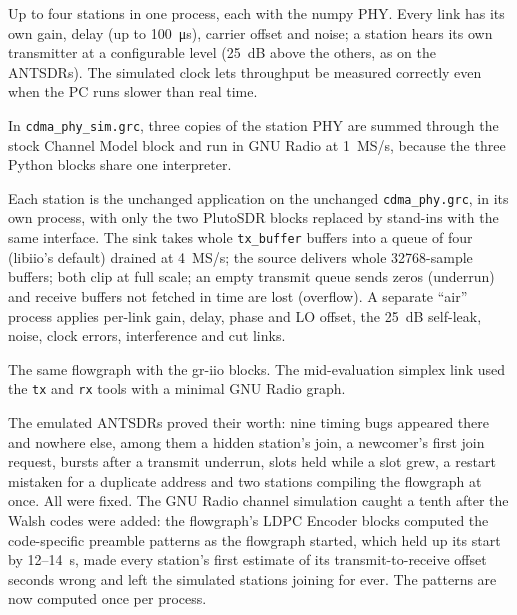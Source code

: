 \documentclass[11pt,a4paper,oneside]{report}
\newcommand{\code}[1]{\texttt{\small #1}}
\begin{document}
\begin{description}[style=nextline,leftmargin=0pt,font=\sffamily\bfseries\color{wldeep}]
  \item[numpy channel simulator.] Up to four stations in one process, each with the numpy PHY. Every
    link has its own gain, delay (up to \SI{100}{\micro s}), carrier offset and noise; a station hears its
    own transmitter at a configurable level (\SI{25}{dB} above the others, as on the ANTSDRs). The
    simulated clock lets throughput be measured correctly even when the PC runs slower than real time.
  \item[GNU Radio channel simulation.] In \code{cdma\_phy\_sim.grc}, three copies of the station PHY are summed through the stock
    Channel Model block and run in GNU Radio at \SI{1}{MS/s}, because the three Python blocks share one
    interpreter.
  \item[Emulated ANTSDRs.] Each station is the unchanged application on the unchanged
    \code{cdma\_phy.grc}, in its own process, with only the two PlutoSDR blocks replaced by stand-ins
    with the same interface. The sink takes whole \code{tx\_buffer} buffers into a queue of four
    (libiio's default) drained at \SI{4}{MS/s}; the source delivers whole \num{32768}-sample buffers; both
    clip at full scale; an empty transmit queue sends zeros (underrun) and receive buffers not fetched
    in time are lost (overflow). A separate ``air'' process applies per-link gain, delay, phase and
    LO offset, the \SI{25}{dB} self-leak, noise, clock errors, interference and cut links.
  \item[Hardware.] The same flowgraph with the gr-iio blocks. The mid-evaluation simplex link used the
    \code{tx} and \code{rx} tools with a minimal GNU Radio graph.
\end{description}

The emulated ANTSDRs proved their worth: nine timing bugs appeared there and nowhere else, among them
a hidden station's join, a newcomer's first join request, bursts after a transmit underrun, slots held
while a slot grew, a restart mistaken for a duplicate address and two stations compiling the flowgraph
at once. All were fixed. The GNU Radio channel simulation caught a tenth after the Walsh codes were
added: the flowgraph's LDPC Encoder blocks computed the code-specific preamble patterns as the
flowgraph started, which held up its start by 12--\SI{14}{s}, made every station's first estimate of its
transmit-to-receive offset seconds wrong and left the simulated stations joining for ever. The patterns
are now computed once per process.
\end{document}
